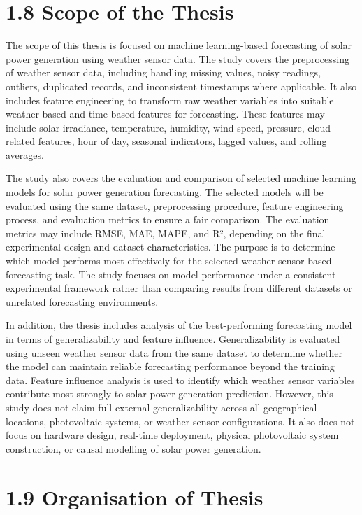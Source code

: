 \section{1.8  Scope of the Thesis}

The scope of this thesis is focused on machine learning-based forecasting of solar power generation using weather sensor data. The study covers the preprocessing of weather sensor data, including handling missing values, noisy readings, outliers, duplicated records, and inconsistent timestamps where applicable. It also includes feature engineering to transform raw weather variables into suitable weather-based and time-based features for forecasting. These features may include solar irradiance, temperature, humidity, wind speed, pressure, cloud-related features, hour of day, seasonal indicators, lagged values, and rolling averages.

The study also covers the evaluation and comparison of selected machine learning models for solar power generation forecasting. The selected models will be evaluated using the same dataset, preprocessing procedure, feature engineering process, and evaluation metrics to ensure a fair comparison. The evaluation metrics may include RMSE, MAE, MAPE, and R², depending on the final experimental design and dataset characteristics. The purpose is to determine which model performs most effectively for the selected weather-sensor-based forecasting task. The study focuses on model performance under a consistent experimental framework rather than comparing results from different datasets or unrelated forecasting environments.

In addition, the thesis includes analysis of the best-performing forecasting model in terms of generalizability and feature influence. Generalizability is evaluated using unseen weather sensor data from the same dataset to determine whether the model can maintain reliable forecasting performance beyond the training data. Feature influence analysis is used to identify which weather sensor variables contribute most strongly to solar power generation prediction. However, this study does not claim full external generalizability across all geographical locations, photovoltaic systems, or weather sensor configurations. It also does not focus on hardware design, real-time deployment, physical photovoltaic system construction, or causal modelling of solar power generation.

\section{1.9  Organisation of Thesis}

